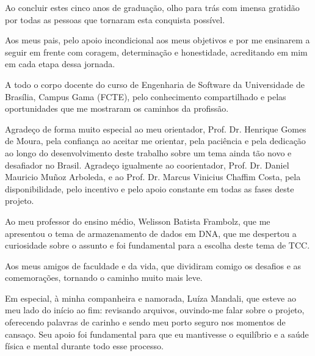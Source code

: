 \begin{agradecimentos}
Ao concluir estes cinco anos de graduação, olho para trás com imensa gratidão por todas as pessoas que tornaram esta conquista possível.

Aos meus pais, pelo apoio incondicional aos meus objetivos e por me ensinarem a seguir em frente com coragem, determinação e honestidade, acreditando em mim em cada etapa dessa jornada.

A todo o corpo docente do curso de Engenharia de Software da Universidade de Brasília, Campus Gama (FCTE), pelo conhecimento compartilhado e pelas oportunidades que me mostraram os caminhos da profissão.

Agradeço de forma muito especial ao meu orientador, Prof. Dr. Henrique Gomes de Moura, pela confiança ao aceitar me orientar, pela paciência e pela dedicação ao longo do desenvolvimento deste trabalho sobre um tema ainda tão novo e desafiador no Brasil. Agradeço igualmente ao coorientador, Prof. Dr. Daniel Mauricio Muñoz Arboleda, e ao Prof. Dr. Marcus Vinicius Chaffim Costa, pela disponibilidade, pelo incentivo e pelo apoio constante em todas as fases deste projeto.

Ao meu professor do ensino médio, Welisson Batista Frambolz, que me apresentou o tema de armazenamento de dados em DNA, que me despertou a curiosidade sobre o assunto e foi fundamental para a escolha deste tema de TCC.

Aos meus amigos de faculdade e da vida, que dividiram comigo os desafios e as comemorações, tornando o caminho muito mais leve.

Em especial, à minha companheira e namorada, Luíza Mandali, que esteve ao meu lado do início ao fim: revisando arquivos, ouvindo-me falar sobre o projeto, oferecendo palavras de carinho e sendo meu porto seguro nos momentos de cansaço. Seu apoio foi fundamental para que eu mantivesse o equilíbrio e a saúde física e mental durante todo esse processo.
\end{agradecimentos}